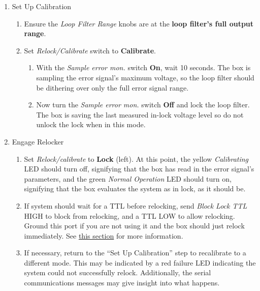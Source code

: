 \documentclass[10pt]{report}
\newcommand{\greenLEDName}[0] {\textit{Normal Operation}}
\newcommand{\yellowLEDName}[0] {\textit{Calibrating}}
\begin{document}
\begin{enumerate}
    \item Set Up Calibration
    \begin{enumerate}
        \item Ensure the \textit{Loop Filter Range} knobs are at the \textbf{loop filter's full output range}.
		\item Set \textit{Relock/Calibrate} switch to \textbf{Calibrate}.\begin{enumerate}
			\item With the \textit{Sample error mon.} switch \textbf{On}, wait 10 seconds. The box is sampling the error signal's maximum voltage, so the loop filter should be dithering over only the full error signal range.
			\item Now turn the \textit{Sample error mon.} switch \textbf{Off} and lock the loop filter. The box is saving the last measured in-lock voltage level so do not unlock the lock when in this mode.
		\end{enumerate} 
	\end{enumerate}
	\item Engage Relocker
	\begin{enumerate}
        \item Set \textit{Relock/calibrate} to \textbf{Lock} (left). At this point, the yellow \yellowLEDName{} LED should turn off, signifying that the box has read in the error signal's parameters, and the green \greenLEDName{} LED should turn on, signifying that the box evaluates the system as in lock, as it should be.
        \item If system should wait for a TTL before relocking, send \textit{Block Lock TTL} HIGH to block from relocking, and a TTL LOW to allow relocking. Ground this port if you are not using it and the box should just relock immediately. See \hyperref[subsec:blockLock]{this section} for more information.
        \item If necessary, return to the ``Set Up Calibration'' step to recalibrate to a different mode. This may be indicated by a red failure LED indicating the system could not successfully relock. Additionally, the serial communications messages may give insight into what happens.
    \end{enumerate}
    
\end{enumerate}
\end{document}
